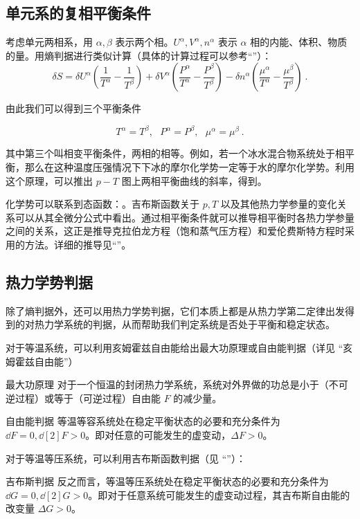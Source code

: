 \subsection{单元系的复相平衡条件}
考虑单元两相系，用 $\alpha,\beta$ 表示两个相。$U^\alpha,V^\alpha,n^\alpha$ 表示 $\alpha$ 相的内能、体积、物质的量。用熵判据进行类似计算（具体的计算过程可以参考“”）：
\begin{equation}
\delta S=\delta U^\alpha\left(\frac{1}{T^\alpha}-\frac{1}{T^\beta}\right)+\delta V^\alpha\left(\frac{P^\alpha}{T^\alpha}-\frac{P^\beta}{T^\beta}\right)
-\delta n^\alpha\left(\frac{\mu^\alpha}{T^\alpha}-\frac{\mu^\beta}{T^\beta}\right)~.
\end{equation}

由此我们可以得到三个平衡条件

\begin{equation}
T^\alpha=T^\beta,\ \ \ P^\alpha=P^\beta,\ \ \ \mu^\alpha=\mu^\beta~.
\end{equation}

其中第三个叫相变平衡条件，两相的相等。例如，若一个冰水混合物系统处于相平衡，那么在这种温度压强情况下下冰的摩尔化学势一定等于水的摩尔化学势。利用这个原理，可以推出 $p-T$ 图上两相平衡曲线的斜率，得到。

化学势可以联系到态函数：。吉布斯函数关于 $p,T$ 以及其他热力学参量的变化关系可以从其全微分公式中看出。通过相平衡条件就可以推导相平衡时各热力学参量之间的关系，这正是推导克拉伯龙方程（饱和蒸气压方程）和爱伦费斯特方程时采用的方法。详细的推导见“”。

\subsection{热力学势判据}
除了熵判据外，还可以用热力学势判据，它们本质上都是从热力学第二定律出发得到的对热力学系统的判据，从而帮助我们判定系统是否处于平衡和稳定状态。

对于等温系统，可以利用亥姆霍兹自由能给出最大功原理或自由能判据（详见 “亥姆霍兹自由能”）
\begin{theorem}{最大功原理}
对于一个恒温的封闭热力学系统，系统对外界做的功总是小于（不可逆过程）或等于（可逆过程）自由能 $F$ 的减少量。
\end{theorem}
\begin{theorem}{自由能判据}
等温等容系统处在稳定平衡状态的必要和充分条件为 $\dd F=0,\dd[2]{F}>0$。即对任意的可能发生的虚变动，$\Delta F>0$。
\end{theorem}

对于等温等压系统，可以利用吉布斯函数判据（见 “”）：
\begin{theorem}{吉布斯判据}
反之而言，等温等压系统处在稳定平衡状态的必要和充分条件为 
$\dd G=0, \dd[2]{G}>0$。即对于任意系统可能发生的虚变动过程，其吉布斯自由能的改变量 $\Delta G>0$。
\end{theorem}
